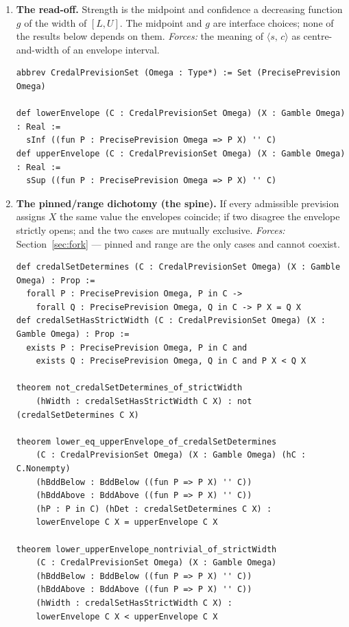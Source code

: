 \documentclass[]{article}
\newcommand{\STV}[2]{\langle #1,\, #2 \rangle}
\begin{document}
\begin{enumerate}
\item \textbf{The read-off.} Strength is the midpoint and confidence a decreasing
function $g$ of the width of $[L,U]$. The midpoint and $g$ are interface
choices; none of the results below depends on them. \emph{Forces:} the meaning of
$\STV{s}{c}$ as centre-and-width of an envelope interval.
\begin{lstlisting}
abbrev CredalPrevisionSet (Omega : Type*) := Set (PrecisePrevision Omega)

def lowerEnvelope (C : CredalPrevisionSet Omega) (X : Gamble Omega) : Real :=
  sInf ((fun P : PrecisePrevision Omega => P X) '' C)
def upperEnvelope (C : CredalPrevisionSet Omega) (X : Gamble Omega) : Real :=
  sSup ((fun P : PrecisePrevision Omega => P X) '' C)
\end{lstlisting}

\item\label{item:dich} \textbf{The pinned/range dichotomy (the spine).} If every
admissible prevision assigns $X$ the same value the envelopes coincide; if two
disagree the envelope strictly opens; and the two cases are mutually exclusive.
\emph{Forces:} Section~\ref{sec:fork} --- pinned and range are the only cases and
cannot coexist.
\begin{lstlisting}
def credalSetDetermines (C : CredalPrevisionSet Omega) (X : Gamble Omega) : Prop :=
  forall P : PrecisePrevision Omega, P in C ->
    forall Q : PrecisePrevision Omega, Q in C -> P X = Q X
def credalSetHasStrictWidth (C : CredalPrevisionSet Omega) (X : Gamble Omega) : Prop :=
  exists P : PrecisePrevision Omega, P in C and
    exists Q : PrecisePrevision Omega, Q in C and P X < Q X

theorem not_credalSetDetermines_of_strictWidth
    (hWidth : credalSetHasStrictWidth C X) : not (credalSetDetermines C X)

theorem lower_eq_upperEnvelope_of_credalSetDetermines
    (C : CredalPrevisionSet Omega) (X : Gamble Omega) (hC : C.Nonempty)
    (hBddBelow : BddBelow ((fun P => P X) '' C))
    (hBddAbove : BddAbove ((fun P => P X) '' C))
    (hP : P in C) (hDet : credalSetDetermines C X) :
    lowerEnvelope C X = upperEnvelope C X

theorem lower_upperEnvelope_nontrivial_of_strictWidth
    (C : CredalPrevisionSet Omega) (X : Gamble Omega)
    (hBddBelow : BddBelow ((fun P => P X) '' C))
    (hBddAbove : BddAbove ((fun P => P X) '' C))
    (hWidth : credalSetHasStrictWidth C X) :
    lowerEnvelope C X < upperEnvelope C X
\end{lstlisting}


\end{enumerate}
\end{document}
